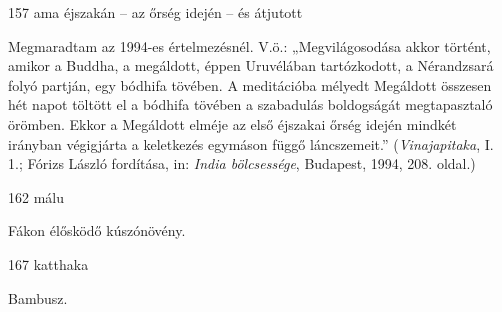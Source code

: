 
\begin{notesdescription}

\item[{157}
{ama éjszakán – az őrség idején – és átjutott}
{}] \hfill\par

Megmaradtam az 1994-es értelmezésnél. V.ö.: „Megvilágosodása akkor történt, amikor a Buddha, a megáldott, éppen Uruvélában tartózkodott, a Nérandzsará folyó partján, egy bódhifa tövében. A meditációba mélyedt Megáldott összesen hét napot töltött el a bódhifa tövében a szabadulás boldogságát megtapasztaló örömben. Ekkor a Megáldott elméje az első éjszakai őrség idején mindkét irányban végigjárta a keletkezés egymáson függő láncszemeit.” (\textit{Vinajapitaka}, I. 1.; Fórizs László fordítása, in: \textit{India bölcsessége}, Budapest, 1994, 208. oldal.)

\item[{162}
{málu}
{}]

Fákon élősködő kúszónövény.

\item[{167}
{katthaka}
{}]

Bambusz.

\end{notesdescription}

